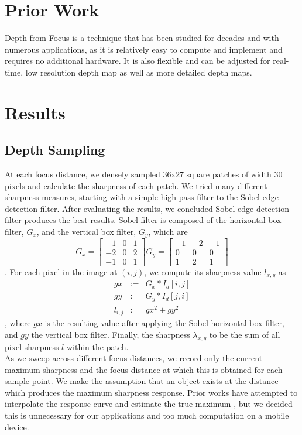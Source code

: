 \documentclass[annual]{acmsiggraph}
\begin{document}
\section{Prior Work}

Depth from Focus is a technique that has been studied for decades \cite{Grossmann1987} \cite{pyramid} and with numerous applications, as it is relatively easy to compute and implement and requires no additional hardware.  It is also flexible and can be adjusted for real-time, low resolution depth map \cite{mobileRobot} as well as more detailed depth maps.

\section{Results}

\subsection{Depth Sampling}
At each focus distance, we densely sampled 36x27 square patches of width 30 pixels and calculate the sharpness of each patch.  We tried many different sharpness measures, starting with a simple high pass filter to the Sobel edge detection filter.  After evaluating the results, we concluded Sobel edge detection filter produces the best results. Sobel filter is composed of the horizontal box filter, $G_x$, and the vertical box filter, $G_y$, which are 
\[
G_x = \begin{bmatrix} -1 & 0 & 1 \\ -2 & 0 & 2 \\ -1 & 0 & 1 \end{bmatrix}
G_y = \begin{bmatrix} -1 & -2 & -1 \\ 0 & 0 & 0 \\ 1 & 2 & 1 \end{bmatrix}
\]. For each pixel in the image at $(i,j)$, we compute its sharpness value $l_{x,y}$ as 
\begin{eqnarray}
gx &:=& G_x * I_d[i,j] \nonumber \\
gy &:=& G_y * I_d[j,i] \nonumber \\
l_{i,j} &:=& gx^2 + gy^2 
\end{eqnarray}, where $gx$ is the resulting value after applying the Sobel horizontal box filter, and $gy$ the vertical box filter. Finally, the sharpness $\lambda_{x,y}$ to be the sum of all pixel sharpness $l$ within the patch. \\
As we sweep across different focus distances, we record only the current maximum sharpness and the focus distance at which this is obtained for each sample point. We make the assumption that an object exists at the distance which produces the maximum sharpness response.  Prior works have attempted to interpolate the response curve and estimate the true maximum \cite{Grossmann1987}, but we decided this is unnecessary for our applications and too much computation on a mobile device. 
\end{document}
